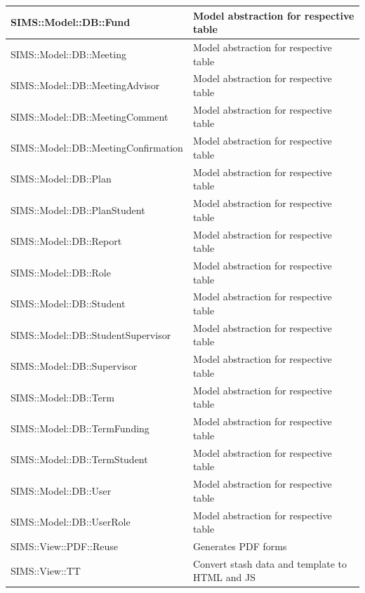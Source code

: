 \documentclass{journal}
\begin{document}
\begin{tabular}{| l | p{7cm} |}
 SIMS::Model::DB::Fund                                           & Model abstraction for respective table\\ \hline
 SIMS::Model::DB::Meeting                                        & Model abstraction for respective table\\ \hline
 SIMS::Model::DB::MeetingAdvisor                                 & Model abstraction for respective table\\ \hline
 SIMS::Model::DB::MeetingComment                                 & Model abstraction for respective table\\ \hline
 SIMS::Model::DB::MeetingConfirmation                            & Model abstraction for respective table\\ \hline
 SIMS::Model::DB::Plan                                           & Model abstraction for respective table\\ \hline
 SIMS::Model::DB::PlanStudent                                    & Model abstraction for respective table\\ \hline
 SIMS::Model::DB::Report                                         & Model abstraction for respective table\\ \hline
 SIMS::Model::DB::Role                                           & Model abstraction for respective table\\ \hline
 SIMS::Model::DB::Student                                        & Model abstraction for respective table\\ \hline
 SIMS::Model::DB::StudentSupervisor                              & Model abstraction for respective table\\ \hline
 SIMS::Model::DB::Supervisor                                     & Model abstraction for respective table\\ \hline
 SIMS::Model::DB::Term                                           & Model abstraction for respective table\\ \hline
 SIMS::Model::DB::TermFunding                                    & Model abstraction for respective table\\ \hline
 SIMS::Model::DB::TermStudent                                    & Model abstraction for respective table\\ \hline
 SIMS::Model::DB::User                                           & Model abstraction for respective table\\ \hline
 SIMS::Model::DB::UserRole                                       & Model abstraction for respective table\\ \hline
 SIMS::View::PDF::Reuse                                          & Generates PDF forms\\ \hline
 SIMS::View::TT                                                  & Convert stash data and template to HTML and JS\\ \hline
\hline
\end{tabular}
\end{document}
